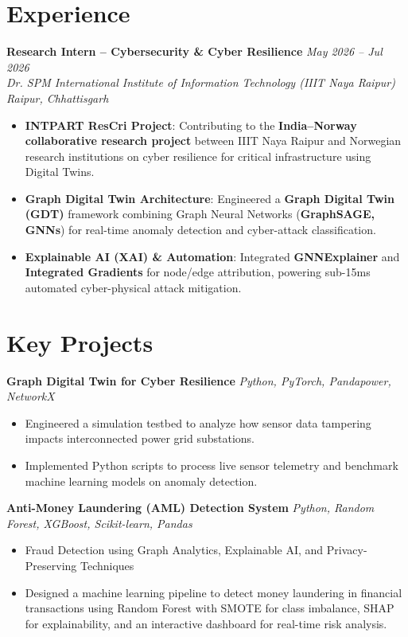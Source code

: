 \documentclass[a4paper,10pt]{article}
\begin{document}
\section{Experience}
\noindent\textbf{Research Intern -- Cybersecurity \& Cyber Resilience} \hfill \textit{May 2026 -- Jul 2026} \\
\textit{Dr. SPM International Institute of Information Technology (IIIT Naya Raipur)} \hfill \textit{Raipur, Chhattisgarh}
\begin{itemize}
    \item \textbf{INTPART ResCri Project}: Contributing to the \textbf{India--Norway collaborative research project} between IIIT Naya Raipur and Norwegian research institutions on cyber resilience for critical infrastructure using Digital Twins.
    \item \textbf{Graph Digital Twin Architecture}: Engineered a \textbf{Graph Digital Twin (GDT)} framework combining Graph Neural Networks (\textbf{GraphSAGE, GNNs}) for real-time anomaly detection and cyber-attack classification.
    \item \textbf{Explainable AI (XAI) \& Automation}: Integrated \textbf{GNNExplainer} and \textbf{Integrated Gradients} for node/edge attribution, powering sub-15ms automated cyber-physical attack mitigation.
\end{itemize}

\section{Key Projects}

\noindent\textbf{Graph Digital Twin for Cyber Resilience} \hfill \textit{Python, PyTorch, Pandapower, NetworkX}
\begin{itemize}
    \item Engineered a simulation testbed to analyze how sensor data tampering impacts interconnected power grid substations.
    \item Implemented Python scripts to process live sensor telemetry and benchmark machine learning models on anomaly detection.
\end{itemize}

\vspace{3.5pt}
\noindent\textbf{Anti-Money Laundering (AML) Detection System} \hfill \textit{Python, Random Forest, XGBoost, Scikit-learn, Pandas}
\begin{itemize}
    \item Fraud Detection using Graph Analytics, Explainable AI, and Privacy-Preserving Techniques
    \item Designed a machine learning pipeline to detect money laundering in financial transactions using Random Forest with SMOTE for class imbalance, SHAP for explainability, and an interactive dashboard for real-time risk analysis.
\end{itemize}
\end{document}
